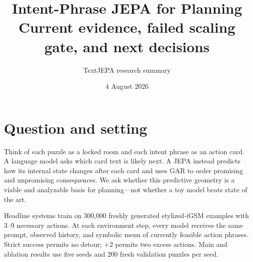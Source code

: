 \documentclass[10pt]{article}
\title{\vspace{-10mm}\textbf{Intent-Phrase JEPA for Planning}\\[-1mm]\large Current evidence, failed scaling gate, and next decisions}
\author{TextJEPA research summary}
\date{4 August 2026}
\begin{document}
\maketitle\vspace{-6mm}
\begin{center}
\end{center}

\section{Question and setting}
Think of each puzzle as a locked room and each intent phrase as an action card. A language model asks which card text is likely next. A JEPA instead predicts how its internal state changes after each card and uses GAR to order promising and unpromising consequences. We ask whether this predictive geometry is a viable and analyzable basis for planning---not whether a toy model beats state of the art.

Headline systems train on 300,000 freshly generated stylized-iGSM examples with 3--9 necessary actions. At each environment step, every model receives the same prompt, observed history, and symbolic menu of currently feasible action phrases. Strict success permits no detour; $+2$ permits two excess actions. Main and ablation results use five seeds and 200 fresh validation puzzles per seed.
\end{document}
